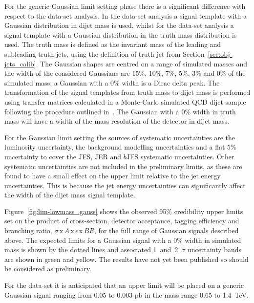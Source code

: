 For the generic Gaussian limit setting phase there is a significant difference
with respect to the \summer{} data-set analysis.
In the \summer{} data-set analysis a signal template with a Gaussian distribution in dijet mass is used,
whilst for the \lm{} data-set analysis a signal template with a Gaussian distribution in the truth mass distribution is used.
The truth mass is defined as the invariant mass of the leading and subleading truth jets,
using the definition of truth jet from Section~\ref{sec:obj-jets_calib}.
The Gaussian shapes are centred on a range of simulated masses and the width of the considered Gaussians are
15\%, 10\%, 7\%, 5\%, 3\% and 0\% of the simulated mass;
a Gaussian with a 0\% width is a Dirac delta peak.
The transformation of the signal templates from truth mass to dijet mass is performed using
transfer matrices calculated in a Monte-Carlo simulated QCD dijet sample
following the procedure outlined in~\cite{dijet-mori17_paper}.
The Gaussian with a 0\% width in truth mass will have
a width of the mass resolution of the detector in dijet mass.

\newpage
For the Gaussian limit setting the sources of systematic uncertainties
are the luminosity uncertainty,
the background modelling uncertainties and a flat 5\% uncertainty to cover
the JES, JER and $b$JES systematic uncertainties.
Other systematic uncertainties are not included in the preliminary limits,
as these are found to have a small effect on the upper limit relative to the jet energy uncertainties.
This is because the jet energy uncertainties can significantly affect the width of the dijet mass signal template.

Figure~\ref{fig:lim-lowmass_gauss} shows the observed 95\% credibility upper limits set 
on the product of cross-section, detector acceptance, tagging efficiency and branching ratio,
$\sigma\,\text{x}\,\mathit{A}\,\text{x}\,\epsilon\,\text{x}\,\mathit{BR}$,
for the full range of Gaussian signals described above.
The expected limits for a Gaussian signal with a 0\% width
in simulated mass is shown by the dotted lines and associated 1~and~2~$\sigma$ uncertainty bands
are shown in green and yellow.
The results have not yet been published so should be considered as preliminary.

For the \lm{} data-set it is anticipated that an upper limit will be placed
on a generic Gaussian signal ranging from 0.05 to 0.003 pb in the mass range 0.65 to 1.4~TeV.

